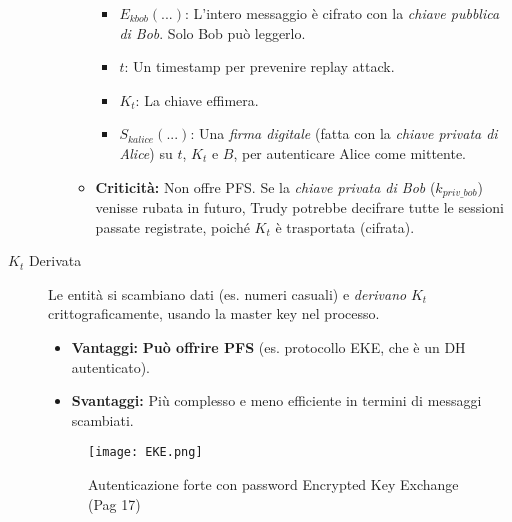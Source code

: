 \documentclass[../main.tex]{subfiles}
\begin{document}
\begin{description}
\begin{itemize}
\begin{itemize}
\begin{itemize}
                            \item $E_{kbob}(...)$: L'intero messaggio è cifrato con la \emph{chiave pubblica di Bob}. Solo Bob può leggerlo.
                            \item $t$: Un timestamp per prevenire replay attack.
                            \item $K_t$: La chiave effimera.
                            \item $S_{kalice}(...)$: Una \emph{firma digitale} (fatta con la \emph{chiave privata di Alice}) su $t$, $K_t$ e $B$, per autenticare Alice come mittente.
                        \end{itemize}
                  \item \textbf{Criticità:} Non offre PFS. Se la \emph{chiave privata di Bob} ($k_{priv\_bob}$) venisse rubata in futuro, Trudy potrebbe decifrare tutte le sessioni passate registrate, poiché $K_t$ è trasportata (cifrata).
              \end{itemize}
    \end{itemize}

    \item[$K_t$ Derivata]
    Le entità si scambiano dati (es. numeri casuali) e \emph{derivano} $K_t$ crittograficamente, usando la master key nel processo.
    \begin{itemize}
        \item \textbf{Vantaggi:} \textbf{Può offrire PFS} (es. protocollo EKE, che è un DH autenticato).
        \item \textbf{Svantaggi:} Più complesso e meno efficiente in termini di messaggi scambiati.
    \end{itemize}
    \begin{figure}[H]
      \centering
      \texttt{[image: EKE.png]}
      \caption{Autenticazione forte con password Encrypted Key Exchange (Pag 17)}
      \label{fig:EKE}
    \end{figure}
    

\end{description}
\end{document}
